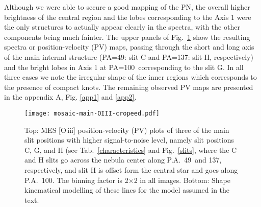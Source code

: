 \documentclass[fleqn,usenatbib,useAMS]{mnras}
\begin{document}
Although we were able to secure a good mapping of the PN, the overall higher brightness of the central region and the lobes corresponding to the Axis 1 were the only structures to actually appear clearly in the spectra, with the other components being much fainter.
The upper panels of Fig.~\ref{main_structures1} show the resulting spectra or position-velocity (PV) maps, passing through the short and long axis of the main internal structure (PA=49\degr: slit C and PA=137\degr: slit H, respectively) and the bright lobes in Axis 1 at PA=100\degr\ corresponding to the slit G.
In all three cases we note the irregular shape of the inner regions which
corresponds to the presence of compact knots.
The remaining observed PV maps are presented in the appendix A, Fig. \ref{app1} and \ref{app2}.


\begin{figure}
\begin{center}
\texttt{[image: mosaic-main-OIII-cropeed.pdf]}
\caption{
Top: MES [O\,{\sc iii}] position-velocity (PV) plots of three of the
main slit positions with higher signal-to-noise level, namely slit
positions C, G, and H (see Tab.~\ref{characteristics} and Fig.~\ref{slits},
where the C and H slits go across the nebula center along P.A.\ 49\degr\
and 137\degr, respectively, and slit H is offset form the central star and
goes along P.A.\ 100\degr.
The binning factor is 2$\times$2 in all images.
Bottom:
{\sc Shape} kinematical modelling of these lines for the model assumed in the
text.
}
\label{main_structures1}
\end{center}
\end{figure} 
\end{document}
